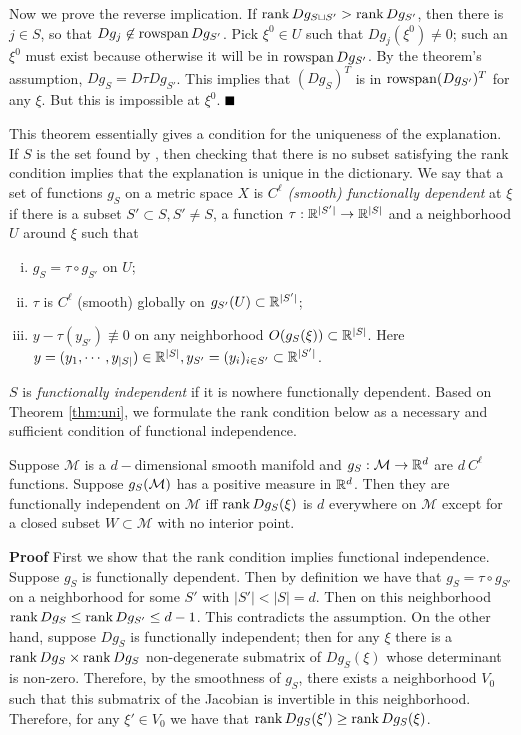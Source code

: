 \par Now we prove the reverse implication. If $\operatorname{rank} Dg_{S\sqcup S'}>\operatorname{rank} Dg_{S'}$, then
there is $j\in S$, so that $Dg_j\not\in \operatorname{rowspan} Dg_{S'}$.  Pick
$\xi^0\in U$ such that $Dg_j(\xi^0)\neq 0$; such an $\xi^0$ must exist
because otherwise it will be in $\operatorname{rowspan} Dg_{S'}$. By the theorem's
assumption, $Dg_{S}=D\tau Dg_{S'}$. This implies that $(Dg_S)^T$ is in
$\operatorname{rowspan} (Dg_{S'})^T$ for any $\xi$. But this is impossible at
$\xi^0$. \hfill $\BlackBox$
\par

This theorem essentially gives a condition for the uniqueness of the explanation. If $S$ is the set found by \ouralg, then checking that there is no subset satisfying the rank condition implies that the explanation is unique in the dictionary. We say that a set of functions $g_S$ on a metric space $X$ is \emph{$C^\ell$ (smooth) functionally dependent} at $\xi$ if there is a subset $S'\subset S,S'\neq S$, a function $\tau:{\mathbb R}^{|S'|}\rightarrow {\mathbb R}^{|S|}$ and a neighborhood $U$ around $\xi$  such that
\begin{enumerate}[(i)]
\item $g_S = \tau \circ g_{S'}$ on $U$;
\item $\tau$ is $C^{\ell}$ (smooth) globally on $g_{S'}(U)\subset{\mathbb R}^{|S'|}$;
\item $y-\tau (y_{S'})\not\equiv 0$ on any neighborhood $O(g_S(\xi))\subset {\mathbb R}^{|S|}$. Here $y=(y_1,\cdots,y_{|S|})\in {\mathbb R}^{|S|},y_{S'}=(y_i)_{i\in S'}\subset {\mathbb R}^{|S'|}$.
\end{enumerate}
$S$ is {\em functionally independent} if it is nowhere functionally dependent. Based on Theorem \ref{thm:uni}, we formulate the rank condition below as a necessary and sufficient condition of functional independence.
\begin{corollary}
\label{cor:funind}
Suppose $\mathcal{M}$ is a $d-$dimensional smooth manifold and $g_{S}: \mathcal{M}\rightarrow {\mathbb R}^d$ are $d \ C^\ell$ functions. Suppose $g_S(\cal M)$ has a positive measure in ${\mathbb R}^d$. Then they are functionally independent on $\mathcal{M}$ iff  $\operatorname{rank} Dg_S(\xi)$ is $d$ everywhere on $\mathcal{M}$ except for a closed subset $W\subset\mathcal{M}$ with no interior point.
\end{corollary}
{\bf Proof}
First we show that the rank condition implies functional independence.
Suppose $g_S$ is functionally dependent. Then by definition we have that $g_S = \tau \circ g_{S'}$ on a neighborhood for some $S'$ with $|S'| < |S|=d$. Then on this neighborhood $\operatorname{rank} Dg_S \leq \operatorname{rank} Dg_{S'} \leq d-1$. This contradicts the assumption. On the other hand, suppose $Dg_S$ is functionally independent; then for any $\xi$ there is a $\operatorname{rank} Dg_S \times \operatorname{rank} Dg_S$ non-degenerate submatrix of $Dg_S(\xi)$ whose determinant is non-zero. Therefore, by the smoothness of $g_S$, there exists a neighborhood $V_0$ such that this submatrix of the Jacobian is invertible in this neighborhood. Therefore, for any $\xi' \in V_0$ we have that $\operatorname{rank} Dg_S(\xi') \geq \operatorname{rank} Dg_S(\xi)$.

